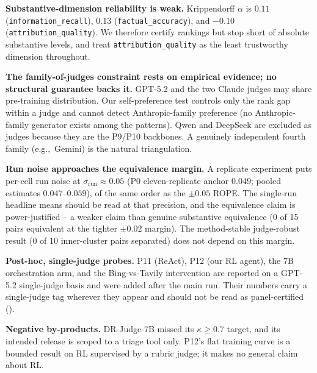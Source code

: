 \documentclass[11pt]{article}
\newcommand{\dimrow}[1]{\texttt{#1}}
\newcommand{\eg}{e.g.,\ }
\begin{document}
\textbf{Substantive-dimension reliability is weak.} Krippendorff $\alpha$ is $0.11$
(\dimrow{information\_recall}), $0.13$ (\dimrow{factual\_accuracy}), and $-0.10$
(\dimrow{attribution\_quality}). We therefore certify rankings but stop short of absolute
substantive levels, and treat \dimrow{attribution\_quality} as the least trustworthy
dimension throughout.

\textbf{The family-of-judges constraint rests on empirical evidence; no structural guarantee
backs it.} GPT-5.2 and the two Claude judges may share pre-training distribution. Our
self-preference test controls only the rank gap within a judge and cannot detect
Anthropic-family preference (no Anthropic-family generator exists among the patterns).
Qwen and DeepSeek are excluded as judges because they are the P9/P10 backbones. A
genuinely independent fourth family (\eg Gemini) is the natural triangulation.

\textbf{Run noise approaches the equivalence margin.} A replicate experiment puts
per-cell run noise at $\sigma_{\text{run}}\approx0.05$ (P0 eleven-replicate anchor
$0.049$; pooled estimates $0.047$--$0.059$), of the same order as the $\pm0.05$
ROPE. The single-run headline means should be read at that precision, and the equivalence
claim is power-justified -- a weaker claim than genuine substantive equivalence (0 of 15
pairs equivalent at the tighter $\pm0.02$ margin). The method-stable judge-robust result (0
of 10 inner-cluster pairs separated) does not depend on this margin.

\textbf{Post-hoc, single-judge probes.} P11 (ReAct), P12 (our RL agent), the 7B
orchestration arm, and the Bing-vs-Tavily intervention are reported on a GPT-5.2
single-judge basis and were added after the main run. Their numbers carry a
single-judge tag wherever they appear and should not be read as panel-certified
().

\textbf{Negative by-products.} DR-Judge-7B missed its $\kappa\geq0.7$ target, and its intended
release is scoped to a triage tool only. P12's flat training curve is a bounded result on
RL supervised by a rubric judge; it makes no general claim about RL.
\end{document}
